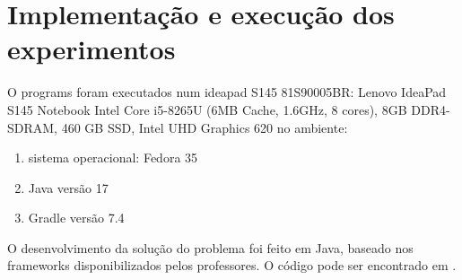 \section{Implementação e execução dos experimentos}

O programs foram executados num ideapad S145 81S90005BR: Lenovo IdeaPad S145 Notebook Intel Core i5-8265U (6MB Cache, 1.6GHz, 8 cores), 8GB DDR4-SDRAM, 460 GB SSD, Intel UHD Graphics 620 no ambiente:

\begin{enumerate}
    \item sistema operacional: Fedora 35
    \item Java versão 17
    \item Gradle versão 7.4
\end{enumerate}

O desenvolvimento da solução do problema foi feito em Java, baseado nos frameworks disponibilizados pelos professores. O código pode ser encontrado em \cite{bib:github}.
